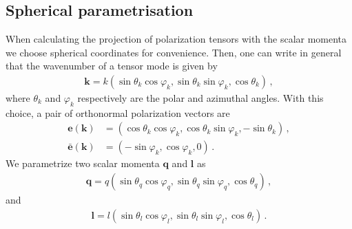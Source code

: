 \documentclass[a4paper,11pt]{article}
\numberwithin{equation}{section}
\begin{document}
\subsection{Spherical parametrisation}
When calculating the projection of polarization tensors with the scalar momenta we choose spherical coordinates for convenience. Then, one can write in general that the wavenumber of a tensor mode is given by
\begin{align}
\mathbf{k}=k(\sin\theta_k\cos\varphi_k,\sin\theta_k\sin\varphi_k,\cos\theta_k)\,,
\end{align}
where $\theta_k$ and $\varphi_k$ respectively are the polar and azimuthal angles. With this choice, a pair of orthonormal polarization vectors are
\begin{align}
\mathbf{e}(\mathbf{k})&=(\cos\theta_k\cos\varphi_k,\cos\theta_k\sin\varphi_k,-\sin\theta_k)\,,\\
\bar{\mathbf{e}}(\mathbf{k})&=(-\sin\varphi_k,\cos\varphi_k,0)\,.
\end{align}
We parametrize two scalar momenta $\mathbf{q}$ and $\mathbf{l}$ as
\begin{align}
\mathbf{q}=q(\sin\theta_{q}\cos\varphi_{q},\sin\theta_{q}\sin\varphi_{q},\cos\theta_{q})\,,
\end{align}
and
\begin{align}
\mathbf{l}=l(\sin\theta_{l}\cos\varphi_{l},\sin\theta_{l}\sin\varphi_{l},\cos\theta_{l})\,.
\end{align}
\end{document}
